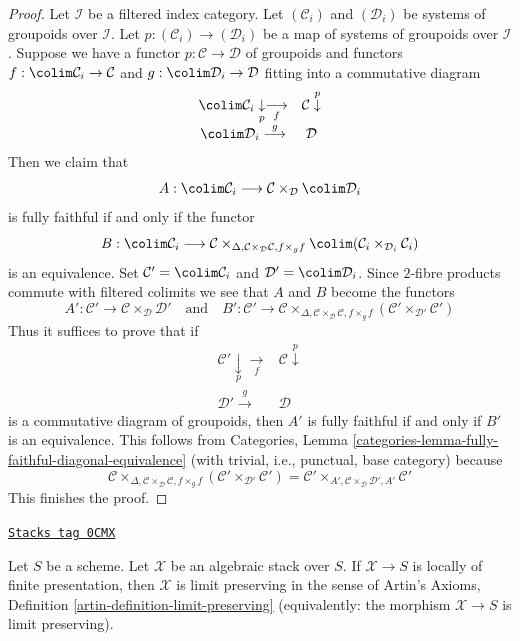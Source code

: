 \begin{proof}
\medskip\noindent
Let $\mathcal{I}$ be a filtered index category.
Let $(\mathcal{C}_i)$ and $(\mathcal{D}_i)$ be systems
of groupoids over $\mathcal{I}$.
Let $p : (\mathcal{C}_i) \to (\mathcal{D}_i)$ be a map
of systems of groupoids over $\mathcal{I}$.
Suppose we have a functor $p : \mathcal{C} \to \mathcal{D}$
of groupoids and functors
$f : \colim \mathcal{C}_i \to \mathcal{C}$ and
$g : \colim \mathcal{D}_i \to \mathcal{D}$
fitting into a commutative diagram
$$
\begin{array}{cc}\colim \mathcal{C}_i \underset{p}{\downarrow}\underset{f}{\longrightarrow} & \mathcal{C} \overset{p}{\downarrow} \\ \colim \mathcal{D}_i \overset{g}{\longrightarrow} & \mathcal{D}\end{array}
$$
Then we claim that
$$
A : \colim \mathcal{C}_i \longrightarrow
\mathcal{C} \times_\mathcal{D} \colim \mathcal{D}_i
$$
is fully faithful if and only if the functor
$$
B : \colim \mathcal{C}_i \longrightarrow
\mathcal{C}
\times_{\Delta, \mathcal{C} \times_\mathcal{D} \mathcal{C}, f \times_g f}
\colim (\mathcal{C}_i \times_{\mathcal{D}_i} \mathcal{C}_i)
$$
is an equivalence. Set $\mathcal{C}' = \colim \mathcal{C}_i$ and
$\mathcal{D}' = \colim \mathcal{D}_i$.
Since $2$-fibre products commute with filtered colimits we see that
$A$ and $B$ become the functors
$$
A' : \mathcal{C}' \to \mathcal{C} \times_\mathcal{D} \mathcal{D}'
\quad\text{and}\quad
B' : \mathcal{C}' \longrightarrow
\mathcal{C}
\times_{\Delta, \mathcal{C} \times_\mathcal{D} \mathcal{C}, f \times_g f}
(\mathcal{C}' \times_{\mathcal{D}'} \mathcal{C}')
$$
Thus it suffices to prove that if
$$
\begin{array}{cc}\mathcal{C}' \underset{p}{\downarrow}\underset{f}{\longrightarrow} & \mathcal{C} \overset{p}{\downarrow} \\ \mathcal{D}' \overset{g}{\longrightarrow} & \mathcal{D}\end{array}
$$
is a commutative diagram of groupoids, then $A'$ is fully faithful
if and only if $B'$ is an equivalence. This follows from
Categories, Lemma \ref{categories-lemma-fully-faithful-diagonal-equivalence}
(with trivial, i.e., punctual, base category) because
$$
\mathcal{C}
\times_{\Delta, \mathcal{C} \times_\mathcal{D} \mathcal{C}, f \times_g f}
(\mathcal{C}' \times_{\mathcal{D}'} \mathcal{C}') =
\mathcal{C}'
\times_{A', \mathcal{C} \times_\mathcal{D} \mathcal{D}', A'}
\mathcal{C}'
$$
This finishes the proof.
\end{proof}

\begin{lemma}
\label{stacks-limits-lemma-locally-finite-presentation-limit-preserving}
\href{https://stacks.math.columbia.edu/tag/0CMX}{\texttt{Stacks tag 0CMX}}

Let $S$ be a scheme. Let $\mathcal{X}$ be an algebraic stack
over $S$. If $\mathcal{X} \to S$ is locally of finite presentation,
then $\mathcal{X}$ is limit preserving in the sense of
Artin's Axioms, Definition \ref{artin-definition-limit-preserving}
(equivalently: the morphism $\mathcal{X} \to S$ is limit preserving).
\end{lemma}

